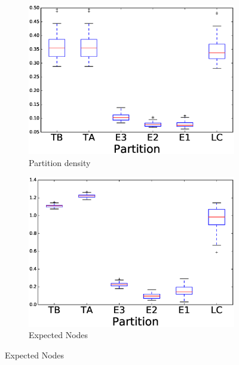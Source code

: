 \begin{figure}
\centering
	\begin{subfigure}{0.31\textwidth}
		\includegraphics[width=\linewidth]{img/ExpectedNodes/LF/LFR1_Partitiondensity_ALL.eps}
		\caption{\label{fig:LFAhn}Partition density}		
	\end{subfigure}
	\begin{subfigure}{0.31\textwidth}
		\includegraphics[width=\linewidth]{img/ExpectedNodes/LF/LFR1_ExpectedNodes_ALL.eps}
		\caption{\label{fig:LFMod}Expected Nodes}		
	\end{subfigure}
	

\end{figure}
